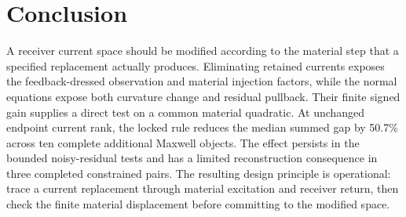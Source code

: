 \section{Conclusion}
A receiver current space should be modified according to the material step that a specified replacement actually produces. Eliminating retained currents exposes the feedback-dressed observation and material injection factors, while the normal equations expose both curvature change and residual pullback. Their finite signed gain supplies a direct test on a common material quadratic. At unchanged endpoint current rank, the locked rule reduces the median summed gap by 50.7\% across ten complete additional Maxwell objects. The effect persists in the bounded noisy-residual tests and has a limited reconstruction consequence in three completed constrained pairs. The resulting design principle is operational: trace a current replacement through material excitation and receiver return, then check the finite material displacement before committing to the modified space.
